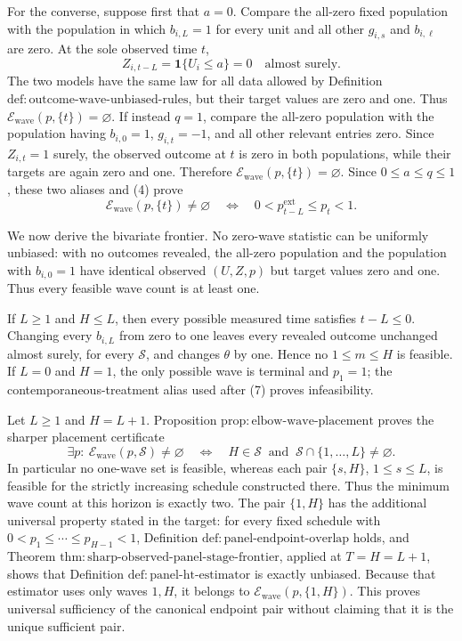 For the converse, suppose first that \(a=0\).  Compare the all-zero fixed population with the population in which \(b_{i,L}=1\) for every unit and all other \(g_{i,s}\) and \(b_{i,\ell}\) are zero.  At the sole observed time \(t\),
\[
 Z_{i,t-L}=\mathbf 1\{U_i\leq a\}=0
 \quad\text{almost surely}.
\tag{7}
\]
The two models have the same law for all data allowed by Definition \(\mathrm{def:outcome\text{-}wave\text{-}unbiased\text{-}rules}\), but their target values are zero and one.  Thus \(\mathcal E_{\mathrm{wave}}(p,\{t\})=\varnothing\).  If instead \(q=1\), compare the all-zero population with the population having \(b_{i,0}=1\), \(g_{i,t}=-1\), and all other relevant entries zero.  Since \(Z_{i,t}=1\) surely, the observed outcome at \(t\) is zero in both populations, while their targets are again zero and one.  Therefore \(\mathcal E_{\mathrm{wave}}(p,\{t\})=\varnothing\).  Since \(0\leq a\leq q\leq1\), these two aliases and (4) prove
\[
 \mathcal E_{\mathrm{wave}}(p,\{t\})\ne\varnothing
 \quad\Longleftrightarrow\quad
 0<p^{\mathrm{ext}}_{t-L}\leq p_t<1.
\tag{8}
\]

We now derive the bivariate frontier.  No zero-wave statistic can be uniformly unbiased: with no outcomes revealed, the all-zero population and the population with \(b_{i,0}=1\) have identical observed \((U,Z,p)\) but target values zero and one.  Thus every feasible wave count is at least one.

If \(L\geq1\) and \(H\leq L\), then every possible measured time satisfies \(t-L\leq0\).  Changing every \(b_{i,L}\) from zero to one leaves every revealed outcome unchanged almost surely, for every \(\mathcal S\), and changes \(\theta\) by one.  Hence no \(1\leq m\leq H\) is feasible.  If \(L=0\) and \(H=1\), the only possible wave is terminal and \(p_1=1\); the contemporaneous-treatment alias used after (7) proves infeasibility.

Let \(L\geq1\) and \(H=L+1\).  Proposition \(\mathrm{prop:elbow\text{-}wave\text{-}placement}\) proves the sharper placement certificate
\[
 \exists p:\ \mathcal E_{\mathrm{wave}}(p,\mathcal S)\ne\varnothing
 \quad\Longleftrightarrow\quad
 H\in\mathcal S\ \text{ and }\
 \mathcal S\cap\{1,\ldots,L\}\ne\varnothing.
\tag{9}
\]
In particular no one-wave set is feasible, whereas each pair \(\{s,H\}\), \(1\leq s\leq L\), is feasible for the strictly increasing schedule constructed there.  Thus the minimum wave count at this horizon is exactly two.  The pair \(\{1,H\}\) has the additional universal property stated in the target: for every fixed schedule with \(0<p_1\leq\cdots\leq p_{H-1}<1\), Definition \(\mathrm{def:panel\text{-}endpoint\text{-}overlap}\) holds, and Theorem \(\mathrm{thm:sharp\text{-}observed\text{-}panel\text{-}stage\text{-}frontier}\), applied at \(T=H=L+1\), shows that Definition \(\mathrm{def:panel\text{-}ht\text{-}estimator}\) is exactly unbiased.  Because that estimator uses only waves \(1,H\), it belongs to \(\mathcal E_{\mathrm{wave}}(p,\{1,H\})\).  This proves universal sufficiency of the canonical endpoint pair without claiming that it is the unique sufficient pair.

